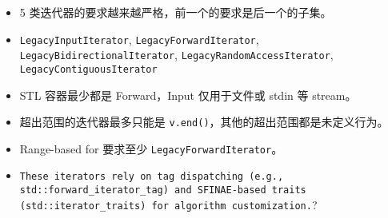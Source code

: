 
\begin{itemize}
\item 5 类迭代器的要求越来越严格，前一个的要求是后一个的子集。
\item \verb`LegacyInputIterator`, \verb`LegacyForwardIterator`, \verb`LegacyBidirectionalIterator`, \verb`LegacyRandomAccessIterator`, \verb`LegacyContiguousIterator`
\item STL 容器最少都是 Forward，Input 仅用于文件或 stdin 等 stream。
\item 超出范围的迭代器最多只能是 \verb`v.end()`，其他的超出范围都是未定义行为。
\item Range-based for 要求至少 \verb`LegacyForwardIterator`。
\item \verb`These iterators rely on tag dispatching (e.g., std::forward_iterator_tag) and SFINAE-based traits (std::iterator_traits) for algorithm customization.`?
\end{itemize}

